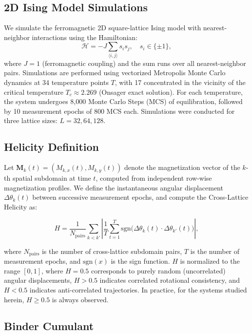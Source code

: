 \documentclass[aps,prl,twocolumn,superscriptaddress,byrevtex]{article}
\begin{document}
\subsection{2D Ising Model Simulations}

We simulate the ferromagnetic 2D square-lattice Ising model with nearest-neighbor
interactions using the Hamiltonian:
\begin{equation}
\mathcal{H} = -J \sum_{\langle i,j \rangle} s_i s_j, \quad s_i \in \{\pm 1\},
\label{eq:hamiltonian}
\end{equation}
where $J = 1$ (ferromagnetic coupling) and the sum runs over all nearest-neighbor pairs.
Simulations are performed using vectorized Metropolis Monte Carlo dynamics at 34
temperature points $T$, with 17 concentrated in the vicinity of the critical temperature
$T_c \approx 2.269$ (Onsager exact solution). For each temperature, the system
undergoes 8,000 Monte Carlo Steps (MCS) of equilibration, followed by 10 measurement
epochs of 800 MCS each. Simulations were conducted for three lattice sizes:
$L = 32, 64, 128$.

\subsection{Helicity Definition}

Let $\mathbf{M}_k(t) = (M_{k,x}(t), M_{k,y}(t))$ denote the magnetization vector of the
$k$-th spatial subdomain at time $t$, computed from independent row-wise magnetization
profiles. We define the instantaneous angular displacement $\Delta\theta_k(t)$ between
successive measurement epochs, and compute the Cross-Lattice Helicity as:

\begin{equation}
H = \frac{1}{N_{\text{pairs}}} \sum_{k < k'} 
\left| \frac{1}{T}\sum_{t=1}^{T} \text{sgn}\big(\Delta\theta_k(t) \cdot \Delta\theta_{k'}(t)\big) \right|,
\label{eq:helicity}
\end{equation}

where $N_{\text{pairs}}$ is the number of cross-lattice subdomain pairs, $T$ is the
number of measurement epochs, and $\text{sgn}(x)$ is the sign function. $H$ is
normalized to the range $[0, 1]$, where $H = 0.5$ corresponds to purely random
(uncorrelated) angular displacements, $H > 0.5$ indicates correlated rotational
consistency, and $H < 0.5$ indicates anti-correlated trajectories. In practice, for
the systems studied herein, $H \geq 0.5$ is always observed.

\subsection{Binder Cumulant}
\end{document}
